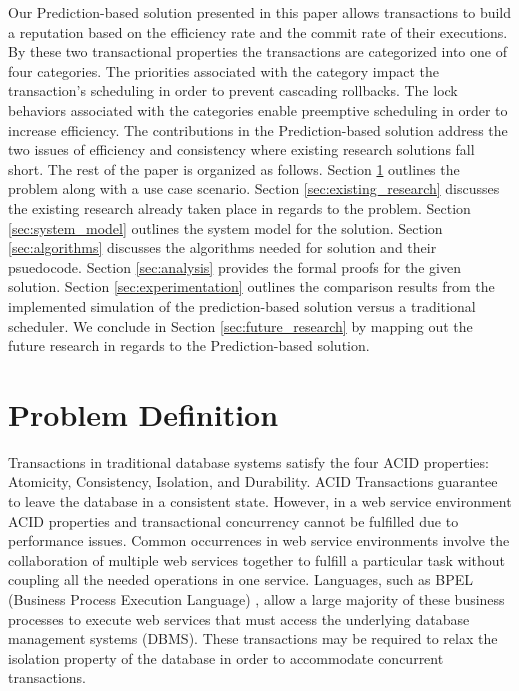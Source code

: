 \documentclass[conference]{IEEEtran}
\begin{document}
Our Prediction-based solution presented in this paper allows transactions to build a reputation based on the efficiency rate and the commit rate of their executions. By these two transactional properties the transactions are categorized into one of four categories. The priorities associated with the category impact the transaction's scheduling in order to prevent cascading rollbacks. The lock behaviors associated with the categories enable preemptive scheduling in order to increase efficiency. The contributions in the Prediction-based solution address the two issues of efficiency and consistency where existing research solutions fall short. The rest of the paper is organized as follows. Section \ref{sec:problem_def} outlines the problem along with a use case scenario. Section \ref{sec:existing_research} discusses the existing research already taken place in regards to the problem. Section \ref{sec:system_model} outlines the system model for the solution. Section \ref{sec:algorithms} discusses the algorithms needed for solution and their psuedocode. Section \ref{sec:analysis} provides the formal proofs for the given solution. Section \ref{sec:experimentation} outlines the comparison results from the implemented simulation of the prediction-based solution versus a traditional scheduler. We conclude in Section \ref{sec:future_research} by mapping out the future research in regards to the Prediction-based solution.

\section{Problem Definition}
\label{sec:problem_def}
Transactions in traditional database systems satisfy the four ACID  properties: Atomicity, Consistency, Isolation, and Durability. ACID Transactions guarantee to leave the database in a consistent state. However, in a web service environment ACID properties and transactional concurrency cannot be fulfilled due to performance issues. Common occurrences in web service environments involve the collaboration of multiple web services together to fulfill a particular task without coupling all the needed operations in one service. Languages, such as BPEL (Business Process Execution Language) \cite{BPEL}, allow a large majority of these business processes to execute web services that must access the underlying database management systems (DBMS). These transactions may be required to relax the isolation property of the database in order to accommodate concurrent transactions.
\end{document}
